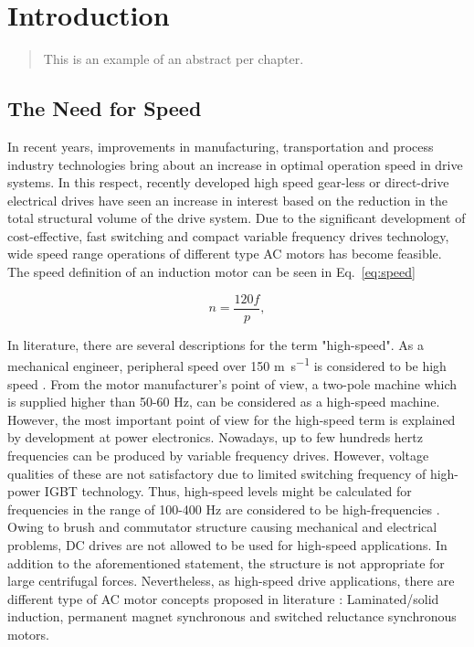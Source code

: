 \chapter{Introduction}

\begin{quote}
{\small This is an example of an abstract per chapter.}
\end{quote} 


\section{The Need for Speed}

In recent years, improvements in manufacturing, transportation and process industry
technologies bring about an increase in optimal operation speed in drive systems. In this
respect, recently developed high speed gear-less or direct-drive electrical drives have seen an
increase in interest based on the reduction in the total structural volume of the drive
system. Due to the significant development of cost-effective, fast switching and compact
variable frequency drives technology, wide speed range operations of different type AC motors
has become feasible. The speed definition of an induction motor can be seen in Eq.\ \ref{eq:speed}

\begin{equation}  \label{eq:speed}
  n = \frac{120 f}{p},
\end{equation}

In literature, there are several descriptions for the term "high-speed".  As a mechanical
engineer, peripheral speed over 150 \si{\meter\per\second} is considered to be high speed
\cite{gieras2011performance}. From the motor manufacturer's point of view, a two-pole machine
which is supplied higher than 50-60 \si{\hertz}, can be considered as a high-speed machine.
However, the most important point of view for the high-speed term is explained by development
at power electronics. Nowadays, up to few hundreds hertz frequencies can be produced by
variable frequency drives. However, voltage qualities of these are not satisfactory due to
limited switching frequency of high-power IGBT technology. Thus, high-speed levels might be
calculated for frequencies in the range of 100-400 \si{\hertz} are considered to be
high-frequencies \cite{pyrhonen1991high}.  Owing to brush and commutator structure causing mechanical and
electrical problems, DC drives are not allowed to be used for high-speed applications. In
addition to the aforementioned statement, the structure is not appropriate for large
centrifugal forces.  Nevertheless, as high-speed drive applications, there are different type
of AC motor concepts proposed in literature \cite{gieras2011performance, pyrhonen1991high, lahteenmaki2002design, saari1998thermal}: Laminated/solid induction, permanent
magnet synchronous and switched reluctance synchronous motors.

